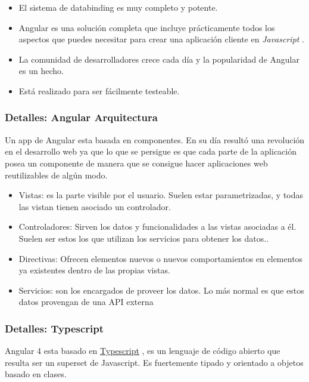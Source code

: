 \begin{itemize}
\tightlist
\item
  El sistema de databinding es muy completo y potente.
\item
  Angular es una solución completa que incluye prácticamente todos los aspectos que puedes necesitar para crear una aplicación cliente en \emph{Javascript} . 
\item
  La comunidad de desarrolladores crece cada día y la popularidad de Angular es un hecho.
  \item
  Está realizado para ser fácilmente testeable.
\end{itemize}
 
\subsubsection{Detalles: Angular Arquitectura}\label{detalle-angulararquitectura}
Un app de Angular esta basada en componentes. En su día resultó una revolución en el desarrollo web ya que lo que se persigue es que cada parte de la aplicación posea un componente de manera que se consigue hacer aplicaciones web reutilizables de algún modo.

\begin{itemize}
\tightlist
\item
Vistas: es la parte visible por el usuario. Suelen estar parametrizadas, y todas
las vistan tienen asociado un controlador.
\item
 Controladores: Sirven los datos y funcionalidades a las vistas asociadas a él. Suelen ser estos los que utilizan los servicios para obtener los datos.. 
\item
 Directivas: Ofrecen elementos nuevos o nuevos comportamientos en elementos ya existentes dentro de las propias vistas.
  \item
  Servicios: son los encargados de proveer los datos. Lo más normal es que estos datos provengan de una API externa
\end{itemize}


\subsubsection{Detalles: Typescript}\label{detalle-typescript}
Angular 4 esta basado en  \hyperlink{https://es.wikipedia.org/wiki/TypeScript}{Typescript} , es un lenguaje de código abierto que resulta ser un superset de Javascript. Es fuertemente tipado y orientado a objetos basado en clases.


